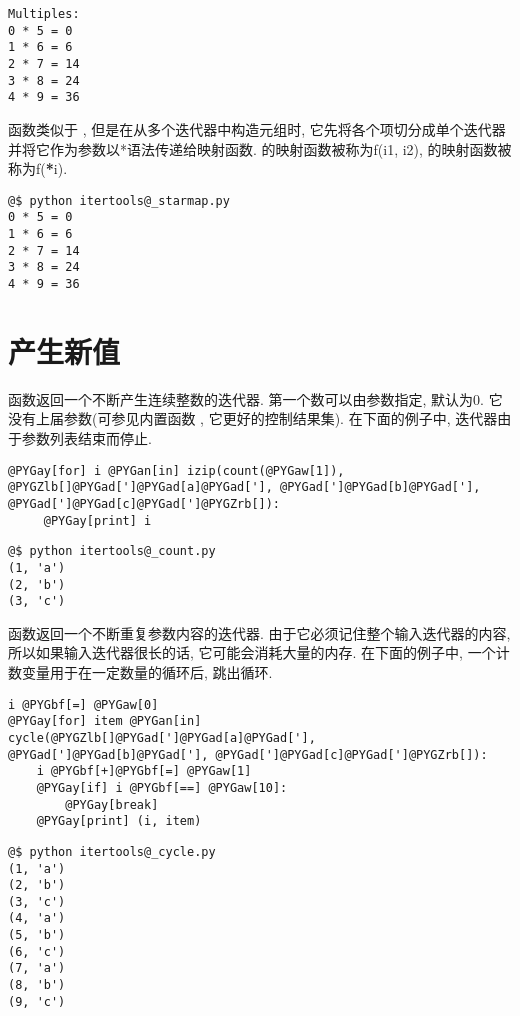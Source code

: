 \documentclass[a4paper,10pt,english]{manual}
\begin{document}
\begin{Verbatim}[commandchars=@\[\]]
Multiples:
0 * 5 = 0
1 * 6 = 6
2 * 7 = 14
3 * 8 = 24
4 * 9 = 36
\end{Verbatim}

 函数类似于  , 但是在从多个迭代器中构造元组时, 它先将各个项切分成单个迭代器并将它作为参数以*语法传递给映射函数.  的映射函数被称为f(i1, i2),  的映射函数被称为f({\color{red}\bfseries{}*}i).

\begin{Verbatim}[commandchars=@\[\]]
@$ python itertools@_starmap.py
0 * 5 = 0
1 * 6 = 6
2 * 7 = 14
3 * 8 = 24
4 * 9 = 36
\end{Verbatim}


\section{产生新值}

 函数返回一个不断产生连续整数的迭代器. 第一个数可以由参数指定, 默认为0. 它没有上届参数(可参见内置函数  , 它更好的控制结果集). 在下面的例子中, 迭代器由于参数列表结束而停止.

\begin{Verbatim}[commandchars=@\[\]]
@PYGay[for] i @PYGan[in] izip(count(@PYGaw[1]), @PYGZlb[]@PYGad[']@PYGad[a]@PYGad['], @PYGad[']@PYGad[b]@PYGad['], @PYGad[']@PYGad[c]@PYGad[']@PYGZrb[]):
     @PYGay[print] i
\end{Verbatim}

\begin{Verbatim}[commandchars=@\[\]]
@$ python itertools@_count.py
(1, 'a')
(2, 'b')
(3, 'c')
\end{Verbatim}

 函数返回一个不断重复参数内容的迭代器. 由于它必须记住整个输入迭代器的内容, 所以如果输入迭代器很长的话, 它可能会消耗大量的内存. 在下面的例子中, 一个计数变量用于在一定数量的循环后, 跳出循环.

\begin{Verbatim}[commandchars=@\[\]]
i @PYGbf[=] @PYGaw[0]
@PYGay[for] item @PYGan[in] cycle(@PYGZlb[]@PYGad[']@PYGad[a]@PYGad['], @PYGad[']@PYGad[b]@PYGad['], @PYGad[']@PYGad[c]@PYGad[']@PYGZrb[]):
    i @PYGbf[+]@PYGbf[=] @PYGaw[1]
    @PYGay[if] i @PYGbf[==] @PYGaw[10]:
        @PYGay[break]
    @PYGay[print] (i, item)
\end{Verbatim}

\begin{Verbatim}[commandchars=@\[\]]
@$ python itertools@_cycle.py
(1, 'a')
(2, 'b')
(3, 'c')
(4, 'a')
(5, 'b')
(6, 'c')
(7, 'a')
(8, 'b')
(9, 'c')
\end{Verbatim}
\end{document}
